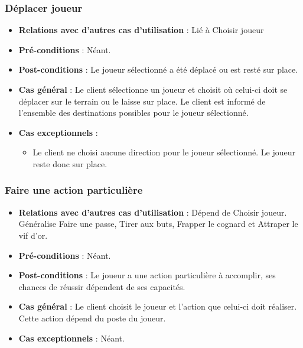 \documentclass[a4paper,titlepage]{scrreprt}
\begin{document}
    \subsubsection{Déplacer joueur}
      \begin{itemize}
        \item \textbf{Relations avec d'autres cas d'utilisation}  : Lié à Choisir joueur
        \item \textbf{Pré-conditions} : Néant.
        \item \textbf{Post-conditions} : Le joueur sélectionné a été déplacé ou est resté sur place.
        \item \textbf{Cas général} : Le client sélectionne un joueur et choisit où celui-ci doit se déplacer sur le terrain ou le laisse sur place. Le client est informé de l’ensemble des destinations possibles pour le joueur sélectionné.
        \item \textbf{Cas exceptionnels} : 
        \begin{itemize}
            \item Le client ne choisi aucune direction pour le joueur sélectionné. Le joueur reste donc sur place.
          \end{itemize}
      \end{itemize}

    \subsubsection{Faire une action particulière}
      \begin{itemize}
        \item \textbf{Relations avec d'autres cas d'utilisation}  : Dépend de Choisir joueur. Généralise Faire une passe, Tirer aux buts, Frapper le cognard et Attraper le vif d'or.
        \item \textbf{Pré-conditions} : Néant.
        \item \textbf{Post-conditions} : Le joueur a une action particulière à accomplir, ses chances de réussir dépendent de ses capacités.
        \item \textbf{Cas général} : Le client choisit le joueur et l’action que celui-ci doit réaliser. Cette action dépend du poste du joueur.
        \item \textbf{Cas exceptionnels} : Néant.
      \end{itemize}
\end{document}
